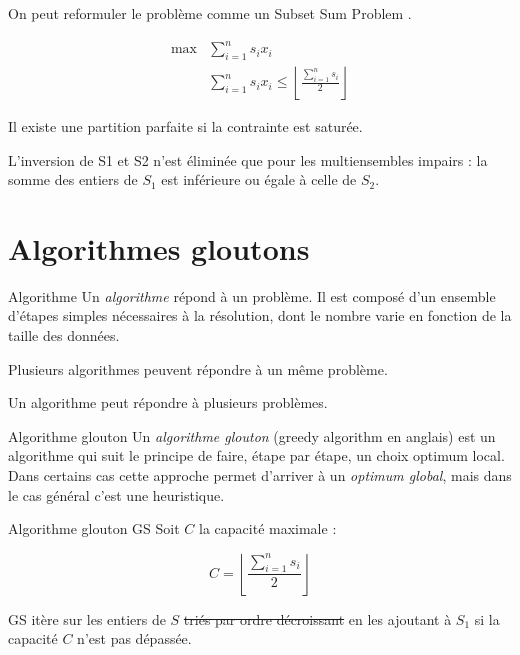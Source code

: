 \documentclass[11pt]{article}
\begin{document}
  \begin{remarque}{}
    On peut reformuler le problème comme un Subset Sum Problem \cite{SSP}.

    \begin{eqnarray*}
      \max & \sum\limits_{i=1}^n s_i x_i \\
      &\sum\limits_{i=1}^n s_i x_i  \leq \left\lfloor \frac{\sum\limits_{i=1}^n s_i}{2} \right\rfloor 
    \end{eqnarray*}

    Il existe une partition parfaite si la contrainte est saturée.

    L'inversion de S1 et S2 n'est éliminée que pour les multiensembles impairs : la somme des entiers de $S_1$ est inférieure ou égale à celle de $S_2$.
  \end{remarque}

  \section{Algorithmes gloutons}

  \begin{definition}{Algorithme}
    Un \emph{algorithme} répond à un problème. Il est composé d’un ensemble d’étapes simples nécessaires à la résolution, dont le nombre varie en fonction de la taille des données.
  \end{definition}

  \begin{remarque}{}
    Plusieurs algorithmes peuvent répondre à un même problème.
  \end{remarque}

  \begin{remarque}{}
    Un algorithme peut répondre à plusieurs problèmes.
  \end{remarque}

  \begin{definition}{Algorithme glouton}
    Un \emph{algorithme glouton} (greedy algorithm en anglais) est un algorithme qui suit le principe de faire, étape par étape, un choix optimum local. Dans certains cas cette approche permet d'arriver à un \emph{optimum global}, mais dans le cas général c'est une heuristique.
  \end{definition}

  \begin{algorithme}{Algorithme glouton GS}
    Soit $C$ la capacité maximale :  
    
    $$C = \left\lfloor \frac{\sum_{i=1}^n s_i}{2} \right\rfloor$$
    
    GS itère sur les entiers de $S$ \sout{triés par ordre décroissant} en les ajoutant à $S_1$ si la capacité $C$ n'est pas dépassée.
  \end{algorithme}
\end{document}
